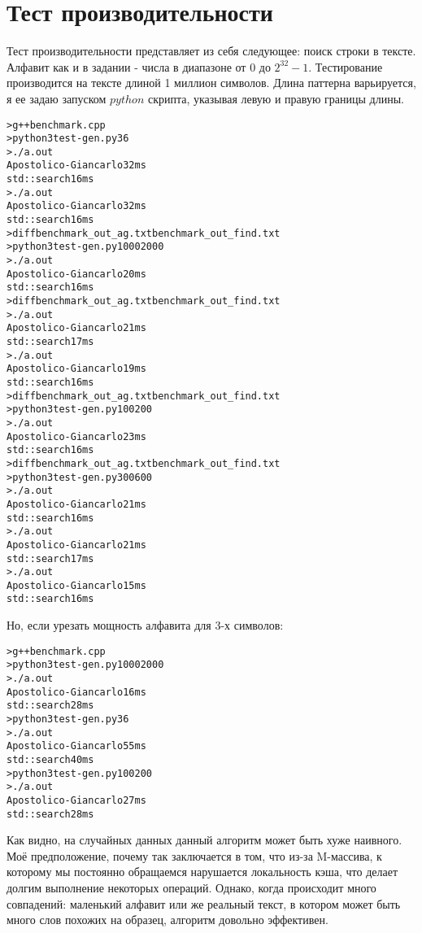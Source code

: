 \section{Тест производительности}


Тест производительности представляет из себя следующее: поиск строки в тексте. Алфавит как и в задании - числа в диапазоне от $0$ до $2^{32} - 1$. Тестирование производится на тексте длиной 1 миллион символов. Длина паттерна варьируется, я ее задаю запуском $python$ скрипта, указывая левую и правую границы длины.

\begin{alltt}
> g++ benchmark.cpp
> python3 test-gen.py 3 6
> ./a.out
Apostolico-Giancarlo 32ms
std::search 16ms
> ./a.out
Apostolico-Giancarlo 32ms
std::search 16ms
> diff benchmark_out_ag.txt benchmark_out_find.txt
> python3 test-gen.py 1000 2000
> ./a.out
Apostolico-Giancarlo 20ms
std::search 16ms
> diff benchmark_out_ag.txt benchmark_out_find.txt
> ./a.out
Apostolico-Giancarlo 21ms
std::search 17ms
> ./a.out
Apostolico-Giancarlo 19ms
std::search 16ms
> diff benchmark_out_ag.txt benchmark_out_find.txt
> python3 test-gen.py 100 200
> ./a.out
Apostolico-Giancarlo 23ms
std::search 16ms
> diff benchmark_out_ag.txt benchmark_out_find.txt
> python3 test-gen.py 300 600
> ./a.out
Apostolico-Giancarlo 21ms
std::search 16ms
> ./a.out
Apostolico-Giancarlo 21ms
std::search 17ms
> ./a.out
Apostolico-Giancarlo 15ms
std::search 16ms
\end{alltt}

Но, если урезать мощность алфавита для 3-х символов:

\begin{alltt}
> g++ benchmark.cpp
> python3 test-gen.py 1000 2000
> ./a.out
Apostolico-Giancarlo 16ms
std::search 28ms
> python3 test-gen.py 3 6
> ./a.out
Apostolico-Giancarlo 55ms
std::search 40ms
> python3 test-gen.py 100 200
> ./a.out
Apostolico-Giancarlo 27ms
std::search 28ms
\end{alltt}

Как видно, на случайных данных данный алгоритм может быть хуже наивного. Моё предположение, почему так заключается в том, что из-за M-массива, к которому мы постоянно обращаемся нарушается локальность кэша, что делает долгим выполнение некоторых операций.
Однако, когда происходит много совпадений: маленький алфавит или же реальный текст, в котором может быть много слов похожих на образец, алгоритм довольно эффективен.

\pagebreak

